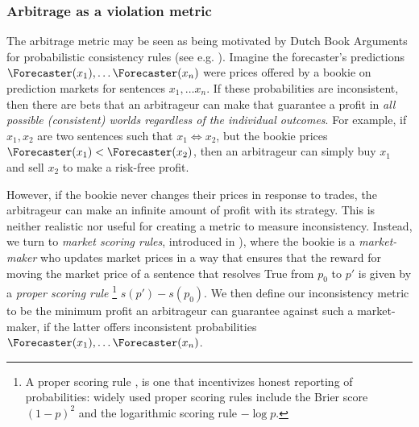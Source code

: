\subsubsection{Arbitrage as a violation metric}
\label{cfc/app:arbitrage}


\begin{notation*}

\end{notation*}


The arbitrage metric may be seen as being motivated by Dutch Book Arguments for probabilistic consistency rules (see e.g. \cite{vinebergDutchBookArguments2022}). Imagine the forecaster's predictions $\Forecaster(x_1),\dots\Forecaster(x_n)$ were prices offered by a bookie on prediction markets for sentences $x_1,\dots x_n$. If these probabilities are inconsistent, then there are bets that an arbitrageur can make that guarantee a profit in \emph{all possible (consistent) worlds regardless of the individual outcomes}. For example, if $x_1,x_2$ are two sentences such that $x_1\iff x_2$, but the bookie prices $\Forecaster(x_1)<\Forecaster(x_2)$, then an arbitrageur can simply buy $x_1$ and sell $x_2$ to make a risk-free profit.

However, if the bookie never changes their prices in response to trades, the arbitrageur can make an infinite amount of profit with its strategy. This is neither realistic nor useful for creating a metric to measure inconsistency. Instead, we turn to \emph{market scoring rules}, introduced in \citet{hansonLogarithmicMarketScoring2002}), where the bookie is a \emph{market-maker} who updates market prices in a way that ensures that the reward for moving the market price of a sentence that resolves True from $p_0$ to $p'$ is given by a \emph{proper scoring rule} \footnote{A proper scoring rule \citep{savageElicitationPersonalProbabilities1971}, is one that incentivizes honest reporting of probabilities: widely used proper scoring rules include the Brier score $(1-p)^2$ and the logarithmic scoring rule $-\log p$.} $s(p')-s(p_0)$. We then define our inconsistency metric to be the minimum profit an arbitrageur can guarantee against such a market-maker, if the latter offers inconsistent probabilities $\Forecaster(x_1),\dots\Forecaster(x_n)$.

